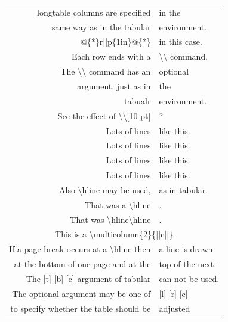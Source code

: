 \documentclass{ctexart}
\begin{document}
\begin{longtable}{@{*}r||p{1in}@{*}}
            \textsf{longtable} columns are specified&in the\\
            same way as in the \textsf{tabular}&environment.\\
            \textsf{@\{*\}r||p\{1in\}@\{*\}}&in this case.\\
            Each row ends with a&\textsf{\textbackslash\textbackslash} command.\\
            The \textsf{\textbackslash\textbackslash} command has an&optional\\
            argument, just as in&the\\
            \textsf{tabualr}&environment.\\[10pt]
            See the effect of \textsf{\textbackslash\textbackslash[10 pt]}&?\\
            Lots of lines&like this.\\
            Lots of lines&like this.\\
            Lots of lines&like this.\\
            Lots of lines&like this.\\
            Also \textsf{\textbackslash{}hline} may be used,&as in \textsf{tabular}.\\
            \hline
            That was a \textsf{\textbackslash{}hline}&.\\
            \hline\hline
            That was \textsf{\textbackslash{}hline\textbackslash{}hline}&.\\
            \multicolumn{2}{||c||}{This is a \textsf{\textbackslash{}multicolumn\{2\}\{||c||\}}}\\
            If a page break occurs at a \textsf{\textbackslash{}hline} then&a line is drawn\\
            at the bottom of one page and at the&top of the next.\\
            \hline
            The \textsf{[t] [b] [c]} argument of \textsf{tabular}&can not be used.\\
            The optional argument may be one of&\textsf{[l] [r] [c]}\\
            to specify whether the table should be&adjusted\\

\end{longtable}
\end{document}
